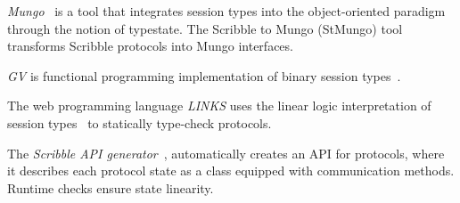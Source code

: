 {\em Mungo}~\cite{mungo} is a tool that integrates session types into the object-oriented
paradigm through the notion of typestate.
The Scribble to Mungo (StMungo) tool transforms Scribble
protocols into Mungo interfaces.


{\em GV} is functional programming implementation of binary session types~\cite{DBLP:journals/jfp/Wadler14}.

The web programming language {\em LINKS}
uses the linear logic interpretation of session types~\cite{DBLP:journals/jfp/Wadler14}
to statically type-check protocols.

The {\em Scribble API generator}~\cite{HY2016}, automatically creates an API for protocols,
where it describes each protocol state as a class equipped with
communication methods. Runtime checks ensure state linearity.






